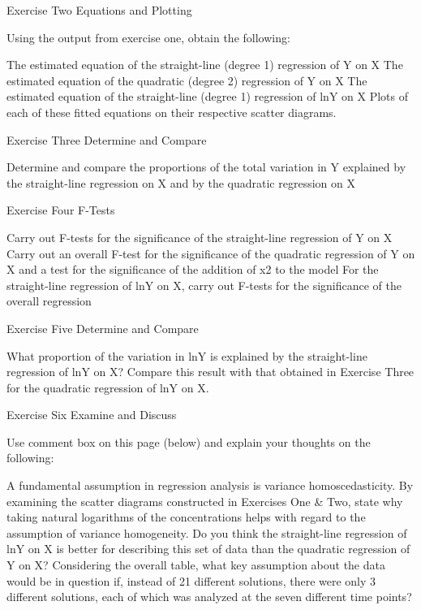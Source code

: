 Exercise Two
Equations and Plotting

Using the output from exercise one, obtain the following:

The estimated equation of the straight-line (degree 1) regression of Y on X
The estimated equation of the quadratic (degree 2) regression of Y on X
The estimated equation of the straight-line (degree 1) regression of lnY on X
Plots of each of these fitted equations on their respective scatter diagrams.
 

Exercise Three
Determine and Compare

Determine and compare the proportions of the total variation in Y explained by the straight-line regression on X and by the quadratic regression on X
 

Exercise Four
F-Tests

Carry out F-tests for the significance of the straight-line regression of Y on X
Carry out an overall F-test for the significance of the quadratic regression of Y on X and a test for the significance of the addition of x2 to the model
For the straight-line regression of lnY on X, carry out F-tests for the significance of the overall regression
 

Exercise Five
Determine and Compare

What proportion of the variation in lnY is explained by the straight-line regression of lnY on X?
Compare this result with that obtained in Exercise Three for the quadratic regression of lnY on X.
 

Exercise Six
Examine and Discuss

Use comment box on this page (below) and explain your thoughts on the following:

A fundamental assumption in regression analysis is variance homoscedasticity. By examining the scatter diagrams constructed in Exercises One & Two, state why taking natural logarithms of the concentrations helps with regard to the assumption of variance homogeneity.
Do you think the straight-line regression of lnY on X is better for describing this set of data than the quadratic regression of Y on X?
Considering the overall table, what key assumption about the data would be in question if, instead of 21 different solutions, there were only 3 different solutions, each of which was analyzed at the seven different time points?
